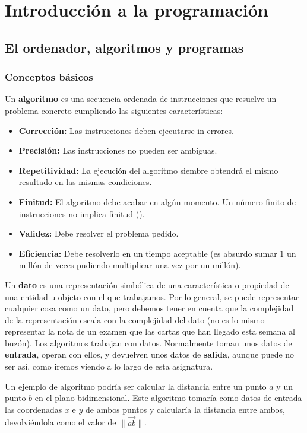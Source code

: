 \chapter{Introducción a la programación}

\section{El ordenador, algoritmos y programas}

\subsection{Conceptos básicos}

Un \textbf{algoritmo} es una secuencia ordenada de instrucciones que resuelve un problema concreto cumpliendo las siguientes características:

\begin{itemize}
	\item\textbf{Corrección:} Las instrucciones deben ejecutarse in errores.
	\item\textbf{Precisión:} Las instrucciones no pueden ser ambiguas.
	\item\textbf{Repetitividad:} La ejecución del algoritmo siembre obtendrá el mismo resultado en las mismas condiciones.
	\item\textbf{Finitud:} El algoritmo debe acabar en algún momento. Un número finito de instrucciones no implica finitud ().
	\item\textbf{Validez:} Debe resolver el problema pedido.
	\item\textbf{Eficiencia:} Debe resolverlo en un tiempo aceptable (es absurdo sumar $1$ un millón de veces pudiendo multiplicar una vez por un millón).
\end{itemize}

Un \textbf{dato} es una representación simbólica de una característica o propiedad de una entidad u objeto con el que trabajamos.
Por lo general, se puede representar cualquier cosa como un dato, pero debemos tener en cuenta que la complejidad de la representación escala con la complejidad del dato (no es lo mismo representar la nota de un examen que las cartas que han llegado esta semana al buzón).
Los algoritmos trabajan con datos.
Normalmente toman unos datos de \textbf{entrada}, operan con ellos, y devuelven unos datos de \textbf{salida}, aunque puede no ser así, como iremos viendo a lo largo de esta asignatura.

Un ejemplo de algoritmo podría ser calcular la distancia entre un punto $a$ y un punto $b$ en el plano bidimensional.
Este algoritmo tomaría como datos de entrada las coordenadas $x$ e $y$ de ambos puntos y calcularía la distancia entre ambos, devolviéndola como el valor de $\|\vec{ab}\|$.


